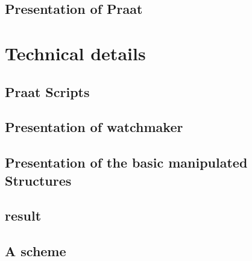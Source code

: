 \documentclass[12pt]{report}
\begin{document}
\chapter{Presentation of Praat}

\part{Technical details}
\chapter{Praat Scripts}
\chapter{Presentation of watchmaker}
\chapter{Presentation of the basic manipulated Structures}
\chapter{result}
\appendix
\chapter{A scheme}

\listoffigures
\listoftables

 
\end{document}
